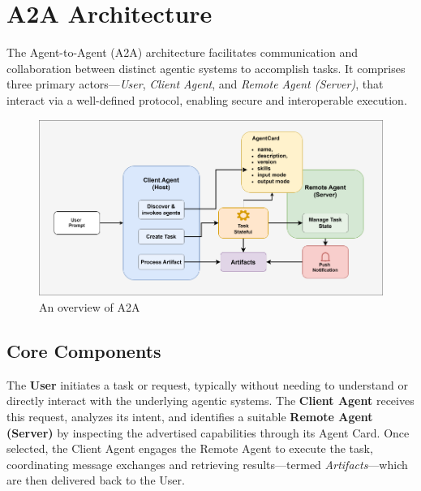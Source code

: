 \documentclass{article}
\begin{document}



\section{A2A Architecture}
The Agent-to-Agent (A2A) architecture facilitates communication and collaboration between distinct agentic systems to accomplish tasks. It comprises three primary actors—\textit{User}, \textit{Client Agent}, and \textit{Remote Agent (Server)}, that interact via a well-defined protocol, enabling secure and interoperable execution.

\begin{figure}
    \centering
    \includegraphics[width=\linewidth]{a2a.png}
    \caption{An overview of A2A}
    \label{fig:A2A}
\end{figure}


\subsection{Core Components}
The \textbf{User} initiates a task or request, typically without needing to understand or directly interact with the underlying agentic systems. The \textbf{Client Agent} receives this request, analyzes its intent, and identifies a suitable \textbf{Remote Agent (Server)} by inspecting the advertised capabilities through its Agent Card. Once selected, the Client Agent engages the Remote Agent to execute the task, coordinating message exchanges and retrieving results—termed \textit{Artifacts}—which are then delivered back to the User.
\end{document}

